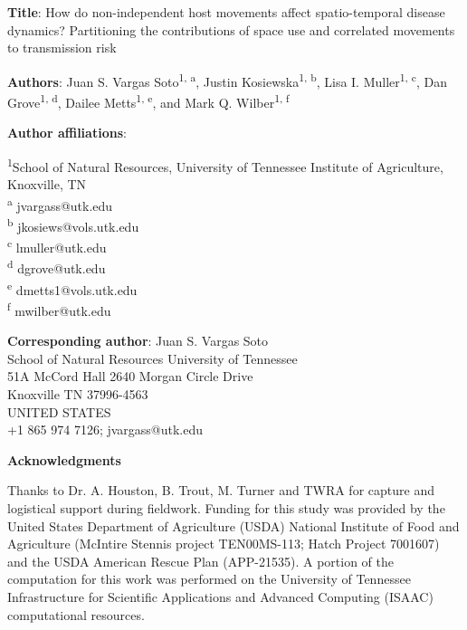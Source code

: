 \documentclass[letterpaper]{article}
\begin{document}
\noindent
\textbf{Title}: How do non-independent host movements affect spatio-temporal disease dynamics? Partitioning the contributions of space use and correlated movements to transmission risk

\bigskip

\noindent

\bigskip

\noindent
\textbf{Authors}: Juan S. Vargas Soto\textsuperscript{1, a}, Justin Kosiewska\textsuperscript{1, b}, Lisa I. Muller\textsuperscript{1, c}, Dan Grove\textsuperscript{1, d}, Dailee Metts\textsuperscript{1, e}, and Mark Q. Wilber\textsuperscript{1, f}

\bigskip

\noindent
\textbf{Author affiliations}:

\noindent
\textsuperscript{1}School of Natural Resources, University of Tennessee Institute of Agriculture, Knoxville, TN \\
\textsuperscript{a} jvargass@utk.edu\\
\textsuperscript{b} jkosiews@vols.utk.edu\\
\textsuperscript{c} lmuller@utk.edu\\
\textsuperscript{d} dgrove@utk.edu\\
\textsuperscript{e} dmetts1@vols.utk.edu\\
\textsuperscript{f} mwilber@utk.edu

\bigskip

\noindent
\textbf{Corresponding author}: Juan S. Vargas Soto\\
School of Natural Resources University of Tennessee\\
51A McCord Hall 2640 Morgan Circle Drive\\
Knoxville TN 37996-4563\\
UNITED STATES\\
+1 865 974 7126; jvargass@utk.edu
\bigskip

\noindent
\textbf{Acknowledgments}

Thanks to Dr. A. Houston, B. Trout, M. Turner and TWRA for capture and logistical support during fieldwork. Funding for this study was provided by the United States Department of Agriculture (USDA) National Institute of Food and Agriculture (McIntire Stennis project TEN00MS-113; Hatch Project 7001607) and the USDA American Rescue Plan (APP-21535). A portion of the computation for this work was performed on the University of Tennessee Infrastructure for Scientific Applications and Advanced Computing (ISAAC) computational resources.
\bigskip
\end{document}
